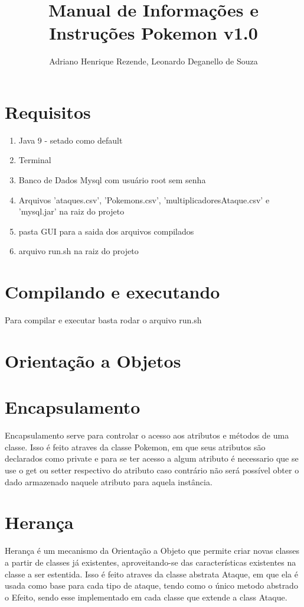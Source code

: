 \documentclass[12pt]{article}
\title{Manual de Informações e Instruções Pokemon v1.0}
\author{Adriano Henrique Rezende, Leonardo Deganello de Souza\inst{1}}
\begin{document}
\maketitle

\section{Requisitos}
\begin{enumerate}
	\item Java 9 - setado como default
	\item Terminal
	\item Banco de Dados Mysql com usuário root sem senha
	\item Arquivos 'ataques.csv', 'Pokemons.csv', 'multiplicadoresAtaque.csv' e 'mysql.jar' na raiz do projeto
	\item pasta GUI para a saida dos arquivos compilados
	\item arquivo run.sh na raiz do projeto
\end{enumerate}

\section{Compilando e executando}
Para compilar e executar basta rodar o arquivo run.sh

\section{Orientação a Objetos}
\section{Encapsulamento}

Encapsulamento serve para controlar o acesso aos atributos e métodos de uma classe. Isso é feito atraves da classe Pokemon, em que seus atributos são declarados como private e para se ter acesso a algum atributo é necessario que se use o get ou setter respectivo do atributo caso contrário não será possível obter o dado armazenado naquele atributo para aquela instância.

\section{Herança}

Herança é um mecanismo da Orientação a Objeto que permite criar novas classes a partir de classes já existentes, aproveitando-se das características existentes na classe a ser estentida. Isso é feito atraves da classe abstrata Ataque, em que ela é usada como base para cada tipo de ataque, tendo como o único metodo abstrado o Efeito, sendo esse implementado em cada classe que extende a class Ataque.
\end{document}
